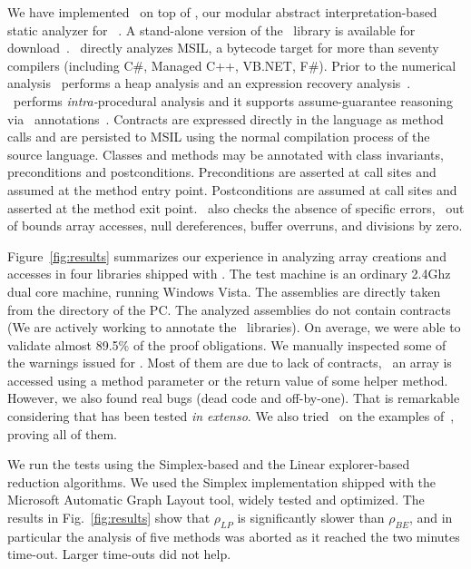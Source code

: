 \documentclass{llncs}
\begin{document}
We have implemented \Subpoly\ on top of \Clousot, our modular abstract
inter\-pre\-ta\-tion-based static analyzer for \NET~\cite{ManagedContracts}. 
A stand-alone version of the \Subpoly\ library is available for
download~\cite{Subpoly}.
\Clousot\ directly analyzes MSIL, a  bytecode target for more than seventy compilers (including C\#, Managed C++, VB.NET, F\#).
Prior to the numerical analysis \Clousot\ performs a heap analysis and an expression recovery analysis~\cite{LogozzoMaf08-2}.
\Clousot\ performs \emph{intra-}procedural analysis and it supports assume-guarantee reasoning via \Foxtrot\ annotations~\cite{FoxtrotClousot}.
Contracts are expressed directly in the language as method calls and are persisted to MSIL using the normal compilation process of the source language.
Classes and methods may be annotated with class invariants, preconditions and postconditions.
Preconditions are asserted at call sites and assumed at the method entry point.
Postconditions are assumed at call sites and asserted at the method exit point.
\Clousot\ also checks the absence of specific errors, \eg\ out of bounds array accesses, null dereferences, buffer overruns, and divisions by zero.

Figure~\ref{fig:results} summarizes our experience in analyzing array
creations and accesses in four libraries shipped with \NET.
The test machine is an ordinary 2.4Ghz dual core machine, running Windows Vista.
The assemblies are directly taken from the  directory of the PC.
The analyzed assemblies do not contain contracts (We are actively working to annotate the \NET\ libraries). 
On average, we were able to validate almost 89.5\% of the proof obligations. 
We manually inspected some of the warnings issued for . 
Most of them are due to lack of contracts, \eg\ an array is accessed using a method parameter or the return value of some helper method.
However, we also found real bugs (dead code and off-by-one). 
That is remarkable considering that  has been tested \emph{in extenso}.
We also tried \Subpoly\ on the examples of~\cite{CousotHalbwachs78,SankaranarayananEtAl07,GulavaniEtAl08,Gulwani09}, proving all of them.

We run the tests using the Simplex-based and the Linear explorer-based reduction algorithms.
We used the Simplex implementation shipped with the Microsoft Automatic Graph Layout tool, widely tested and optimized.
The results in Fig.~\ref{fig:results} show that $\rho_\mathit{LP}$ is significantly slower than  $\rho_\mathit{BE}$, and in particular the analysis of five methods was aborted as it reached the two minutes time-out.
Larger time-outs did not help.
\end{document}

